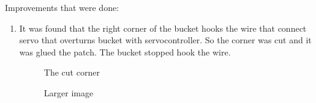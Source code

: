 Improvements that were done:
\begin{enumerate}
	\item It was found that the right corner of the bucket hooks the wire that connect servo that overturns bucket with servocontroller. So the corner was cut and it was glued the patch. The bucket stopped hook the wire.
	\begin{figure}[H]
		\begin{minipage}[h]{0.47\linewidth}
			\caption{The cut corner}
		\end{minipage}
		\hfill
		\begin{minipage}[h]{0.47\linewidth}
			\caption{Larger image}
		\end{minipage}
	\end{figure}
	

\end{enumerate}
